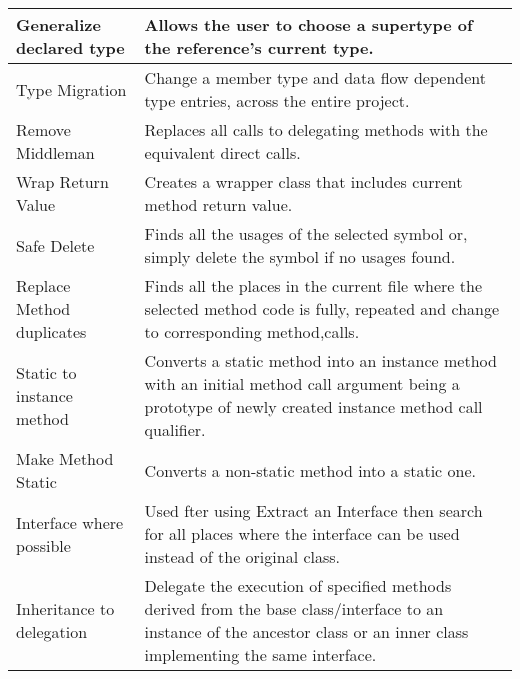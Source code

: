 \begin{table}[h]
\begin{tabular}{p{3 cm} | p{10.5 cm}}
Generalize declared type  & Allows the user to choose a supertype of the reference's current type.                                                                                                    \\ \hline
Type Migration            & Change a member type and data flow dependent type entries, across the entire project.                                                                                     \\ \hline
Remove Middleman          & Replaces all calls to delegating methods with the equivalent direct calls.                                                                                                \\ \hline
Wrap Return Value         & Creates a wrapper class that includes current method return value.                                                                                                        \\ \hline
Safe Delete               & Finds all the usages of the selected symbol or, simply delete the symbol if no usages found.                                                                              \\ \hline
Replace Method duplicates & Finds all the places in the current file where the selected method code is fully, repeated and change to corresponding method,calls.                                      \\ \hline
Static to instance method & Converts a static method into an instance method with an initial method call argument being a prototype of newly created instance method call qualifier.                  \\ \hline
Make Method Static        & Converts a non-static method into a static one.                                                                                                                           \\ \hline
Interface where possible  & Used fter using Extract an Interface then search for all places where the interface can be used instead of the original class.                                            \\ \hline
Inheritance to delegation & Delegate the execution of specified methods derived from the base class/interface to an instance of the ancestor class or an inner class implementing the same interface. \\ \hline
\end{tabular}
\end{table}